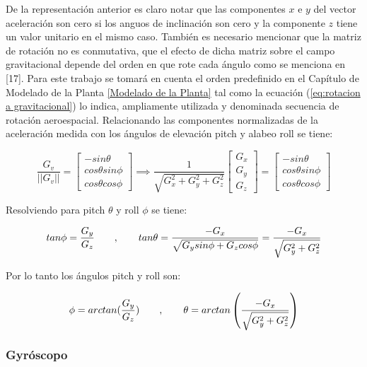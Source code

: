 \documentclass[\main/main.tex]{subfiles}
\begin{document}
De la representación anterior es claro notar que las componentes $x$
e $y$ del vector aceleración son cero si los anguos de inclinación
son cero y la componente $z$ tiene un valor unitario en el mismo
caso. También es necesario mencionar que la matriz de rotación no
es conmutativa, que el efecto de dicha matriz sobre el campo gravitacional
depende del orden en que rote cada ángulo como se menciona en [17].
Para este trabajo se tomará en cuenta el orden predefinido en el
Capítulo de Modelado de la Planta \ref{Modelado de la Planta} tal como la ecuación (\ref{eq:rotacion a gravitacional})
lo indica, ampliamente utilizada y denominada secuencia de rotación
aeroespacial. Relacionando las componentes normalizadas de la aceleración
medida con los ángulos de elevación pitch y alabeo roll se tiene:

\begin{equation}
\frac{G_{v}}{||G_{v}||}=\left[\begin{array}{c}
-sin\theta\\
cos\theta sin\phi\\
cos\theta cos\phi
\end{array}\right]\implies\frac{1}{\sqrt{G_{x}^{2}+G_{y}^{2}+G_{z}^{2}}}\left[\begin{array}{c}
G_{x}\\
G_{y}\\
G_{z}
\end{array}\right]=\left[\begin{array}{c}
-sin\theta\\
cos\theta sin\phi\\
cos\theta cos\phi
\end{array}\right]
\end{equation}

Resolviendo para pitch $\theta$ y roll $\phi$ se tiene:

\begin{equation}
tan\phi=\frac{G_{y}}{G_{z}}\quad\quad,\quad\quad\hfill tan\theta=\frac{-G_{x}}{\sqrt{G_{y}sin\phi+G_{z}cos\phi}}=\frac{-G_{x}}{\sqrt{G_{y}^{2}+G_{z}^{2}}}
\end{equation}

Por lo tanto los ángulos pitch y roll son:

\begin{equation}
\phi=arctan(\frac{G_{y}}{G_{z}})\quad\quad,\quad\quad\hfill \theta=arctan\left(\frac{-G_{x}}{\sqrt{G_{y}^{2}+G_{z}^{2}}}\right)
\end{equation}

\subsubsection{Gyróscopo}
\end{document}
